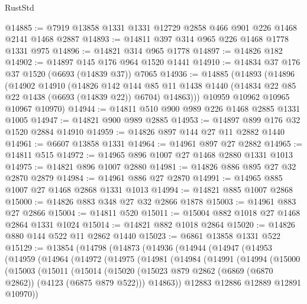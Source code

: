 \begin{lexlean}{RustStd}
\begin{coremodule}
@14885 := @7919 @13858 @1331 @1331 @12729 @2858 @466 @901 @226 @1468 @2141 @1468 @2887
@14893 := @14811 @397 @314 @965 @226 @1468 @1778 @1331 @975
@14896 := @14821 @314 @965 @1778
@14897 := @14826 @182
@14902 := @14897 @145 @176 @964 @1520 @1441
@14910 := @14834 @37 @176 @37 @1520 (@6693 (@14839 @37)) @7065
@14936 := @14885
    (@14893
      (@14896
        (@14902
          @14910
          (@14826
            @142
            @144
            @85
            @11
            @1438
            @1440
            (@14834 @22 @85 @22 @1438 (@6693 (@14839 @22)) @6704)
            @14863)))
      @10959
      @10962
      @10965
      @10967
      @10970)
@14944 := @14811 @510 @900 @989 @226 @1468 @2885 @1331 @1005
@14947 := @14821 @900 @989 @2885
@14953 := @14897 @899 @176 @32 @1520 @2884 @14910
@14959 := @14826 @897 @144 @27 @11 @2882 @1440
@14961 := @6607 @13858 @1331
@14964 := @14961 @897 @27 @2882
@14965 := @14811 @515
@14972 := @14965 @896 @1007 @27 @1468 @2880 @1331 @1013
@14975 := @14821 @896 @1007 @2880
@14981 := @14826 @886 @895 @27 @32 @2870 @2879
@14984 := @14961 @886 @27 @2870
@14991 := @14965 @885 @1007 @27 @1468 @2868 @1331 @1013
@14994 := @14821 @885 @1007 @2868
@15000 := @14826 @883 @348 @27 @32 @2866 @1878
@15003 := @14961 @883 @27 @2866
@15004 := @14811 @520
@15011 := @15004 @882 @1018 @27 @1468 @2864 @1331 @1024
@15014 := @14821 @882 @1018 @2864
@15020 := @14826 @880 @144 @522 @11 @2862 @1440
@15023 := @6861 @13858 @1331 @522
@15129 := @13854
    (@14798
      (@14873
        (@14936
          (@14944
            (@14947
              (@14953
                (@14959
                  (@14964
                    (@14972
                      (@14975
                        (@14981
                          (@14984
                            (@14991
                              (@14994
                                (@15000
                                  (@15003
                                    (@15011
                                      (@15014
                                        (@15020
                                          (@15023
                                            @879
                                            @2862
                                            (@6869 (@6870 @2862))
                                            (@4123 (@6875 @879 @522)))
                                          @14863))
                                      @12883
                                      @12886
                                      @12889
                                      @12891
                                      @10970))

\end{coremodule}
\end{lexlean}
